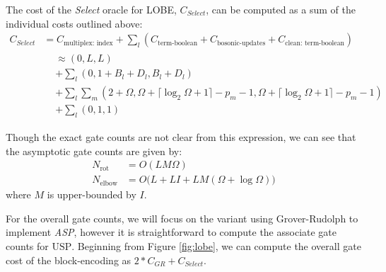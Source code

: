 The cost of the \textit{Select} oracle for LOBE, $C_{\textit{Select}}$, can be computed as a sum of the individual costs outlined above:
\begin{equation}
    \begin{split}
        C_{\textit{Select}} &= C_{\text{multiplex: index}} + \sum_l (C_{\text{term-boolean}} + C_\text{bosonic-updates} + C_{\text{clean: term-boolean}}) \\
        &\begin{split}
            &\approx (0, L, L) \\
            &+ \sum_l (0, 1 + B_l + D_l, B_l + D_l) \\
            &+ \sum_l \sum_m (2 + \Omega, \Omega + \lceil \log_2{\Omega + 1} \rceil - p_m - 1, \Omega + \lceil \log_2{\Omega + 1} \rceil - p_m - 1) \\
            &+ \sum_l (0, 1, 1) \\ 
        \end{split} \\
    \end{split}
\end{equation}
Though the exact gate counts are not clear from this expression, we can see that the asymptotic gate counts are given by:
\begin{equation}
\begin{split}
    N_\text{rot} &= O(LM \Omega) \\
    N_\text{elbow} &= O\big(L + LI + LM(\Omega + \log{\Omega}) \big)
\end{split}
\end{equation}
where $M$ is upper-bounded by $I$.

For the overall gate counts, we will focus on the variant using Grover-Rudolph to implement \textit{ASP}, however it is straightforward to compute the associate gate counts for $\text{USP}$.
Beginning from Figure \ref{fig:lobe}, we can compute the overall gate cost of the block-encoding as $2*C_{GR} + C_{\textit{Select}}$.



